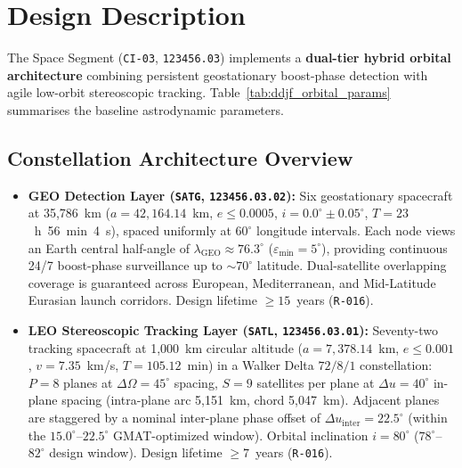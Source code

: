 \section{Design Description}
\label{sec:design_description}

The  Space Segment (\texttt{CI-03},  \texttt{123456.03}) implements a \textbf{dual-tier hybrid orbital architecture} combining persistent geostationary boost-phase detection with agile low-orbit stereoscopic tracking. Table~\ref{tab:ddjf_orbital_params} summarises the baseline astrodynamic parameters.

\subsection{Constellation Architecture Overview}

\begin{itemize}
    \item \textbf{GEO Detection Layer (\texttt{SATG},  \texttt{123456.03.02}):} Six geostationary spacecraft at 35,786~km ($a = 42{,}164.14$~km, $e \le 0.0005$, $i = 0.0^\circ \pm 0.05^\circ$, $T = 23$~h~56~min~4~s), spaced uniformly at $60^\circ$ longitude intervals. Each node views an Earth central half-angle of $\lambda_{\text{GEO}} \approx 76.3^\circ$ ($\varepsilon_{\min} = 5^\circ$), providing continuous 24/7 boost-phase surveillance up to ${\sim}70^\circ$ latitude. Dual-satellite overlapping coverage is guaranteed across European, Mediterranean, and Mid-Latitude Eurasian launch corridors. Design lifetime $\ge 15$~years (\texttt{R-016}).
    \item \textbf{LEO Stereoscopic Tracking Layer (\texttt{SATL},  \texttt{123456.03.01}):} Seventy-two tracking spacecraft at 1,000~km circular altitude ($a = 7{,}378.14$~km, $e \le 0.001$, $v = 7.35$~km/s, $T = 105.12$~min) in a Walker Delta $72/8/1$ constellation: $P = 8$ planes at $\Delta\Omega = 45^\circ$  spacing, $S = 9$ satellites per plane at $\Delta u = 40^\circ$ in-plane spacing (intra-plane arc 5,151~km, chord 5,047~km). Adjacent planes are staggered by a nominal inter-plane phase offset of $\Delta u_{\text{inter}} = 22.5^\circ$ (within the $15.0^\circ$--$22.5^\circ$ GMAT-optimized window). Orbital inclination $i = 80^\circ$ ($78^\circ$--$82^\circ$ design window). Design lifetime $\ge 7$~years (\texttt{R-016}).
\end{itemize}

